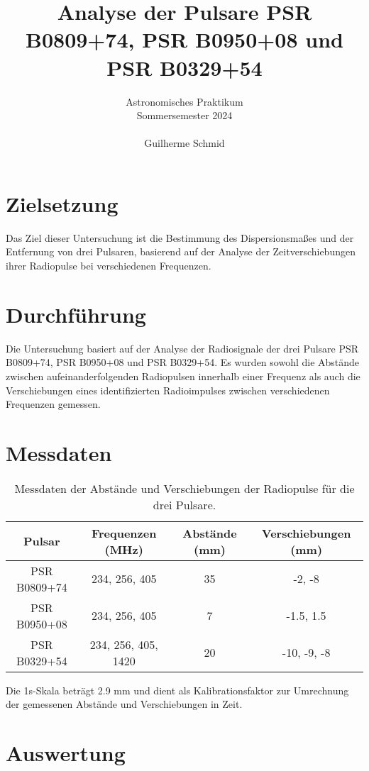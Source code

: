 \documentclass[a4paper,12pt]{article}
\title{Analyse der Pulsare PSR B0809+74, PSR B0950+08 und PSR B0329+54}
\author{Astronomisches Praktikum \\
Sommersemester 2024\\\\
Guilherme Schmid}
\date{}
\begin{document}
\maketitle

\section*{Zielsetzung}
Das Ziel dieser Untersuchung ist die Bestimmung des Dispersionsmaßes und der Entfernung von drei Pulsaren, basierend auf der Analyse der Zeitverschiebungen ihrer Radiopulse bei verschiedenen Frequenzen.

\section*{Durchführung}
Die Untersuchung basiert auf der Analyse der Radiosignale der drei Pulsare PSR B0809+74, PSR B0950+08 und PSR B0329+54. Es wurden sowohl die Abstände zwischen aufeinanderfolgenden Radiopulsen innerhalb einer Frequenz als auch die Verschiebungen eines identifizierten Radioimpulses zwischen verschiedenen Frequenzen gemessen.

\section*{Messdaten}

\begin{table}[H]
\centering
\begin{tabular}{|c|c|c|c|}
\hline
Pulsar         & Frequenzen (MHz)              & Abstände (mm)    & Verschiebungen (mm) \\ \hline
PSR B0809+74   & 234, 256, 405                 & 35               & -2, -8              \\ \hline
PSR B0950+08   & 234, 256, 405                 & 7                & -1.5, 1.5           \\ \hline
PSR B0329+54   & 234, 256, 405, 1420           & 20               & -10, -9, -8         \\ \hline
\end{tabular}
\caption{Messdaten der Abstände und Verschiebungen der Radiopulse für die drei Pulsare.}
\end{table}

Die 1s-Skala beträgt 2.9 mm und dient als Kalibrationsfaktor zur Umrechnung der gemessenen Abstände und Verschiebungen in Zeit.

\section*{Auswertung}
\end{document}
